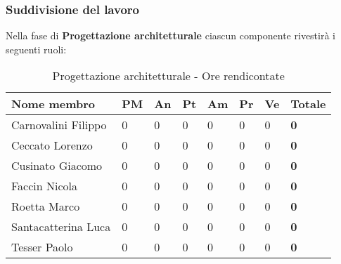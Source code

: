 		\subsubsection{Suddivisione del lavoro} %
		\label{ssub:suddivisione_del_lavoro}
		Nella fase di \textbf{Progettazione architetturale} ciascun componente rivestirà i seguenti ruoli: \\
			\begin{table}[!h]
				\begin{center}
					\begin{tabularx}{0.9\textwidth}{|l|l|l|l|l|l|l|X|}
						\hline
						\textbf{Nome membro} & \textbf{PM} & \textbf{An} & \textbf{Pt} & \textbf{Am} & \textbf{Pr} & \textbf{Ve} & \textbf{Totale} \\
						\hline
						Carnovalini Filippo & 0 & 0 & 0 & 0 & 0 & 0 & \textbf{0} \\
						\hline
						Ceccato Lorenzo & 0 & 0 & 0 & 0 & 0 & 0 & \textbf{0} \\
						\hline
						Cusinato Giacomo & 0 & 0 & 0 & 0 & 0 & 0 & \textbf{0} \\
						\hline
						Faccin Nicola & 0 & 0 & 0 & 0 & 0 & 0 & \textbf{0} \\
						\hline
						Roetta Marco & 0 & 0 & 0 & 0 & 0 & 0 & \textbf{0} \\
						\hline
						Santacatterina Luca & 0 & 0 & 0 & 0 & 0 & 0 & \textbf{0} \\
						\hline
						Tesser Paolo & 0 & 0 & 0 & 0 & 0 & 0 & \textbf{0} \\
						\hline	
					\end{tabularx}
				\end{center}
			\caption{Progettazione architetturale - Ore rendicontate}
			\end{table}

		
